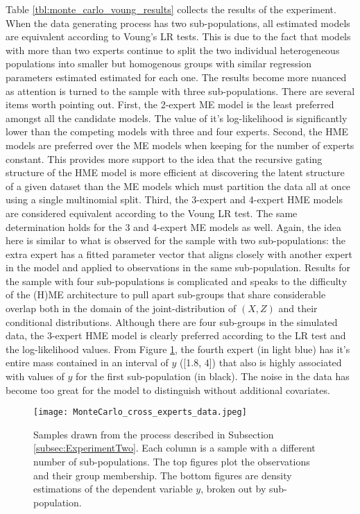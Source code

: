 \documentclass[12pt]{article}
\theoremstyle{definition}
\begin{document}
Table \ref{tbl:monte_carlo_voung_results} collects the results of the experiment. When the data generating process has two sub-populations, all estimated models are equivalent according to Voung's LR tests. This is due to the fact that models with more than two experts continue to split the two individual heterogeneous populations into smaller but homogenous groups with similar regression parameters estimated estimated for each one. The results become more nuanced as attention is turned to the sample with three sub-populations. There are several items worth pointing out. First, the 2-expert ME model is the least preferred amongst all the candidate models. The value of it's log-likelihood is significantly lower than the competing models with three and four experts. Second, the HME models are preferred over the ME models when keeping for the number of experts constant. This provides more support to the idea that the recursive gating structure of the HME model is more efficient at discovering the latent structure of a given dataset than the ME models which must partition the data all at once using a single multinomial split. Third, the 3-expert and 4-expert HME models are considered equivalent according to the Voung LR test. The same determination holds for the 3 and 4-expert ME models as well. Again, the idea here is similar to what is observed for the sample with two sub-populations: the extra expert has a fitted parameter vector that aligns closely with another expert in the model and applied to observations in the same sub-population. Results for the sample with four sub-populations is complicated and speaks to the difficulty of the (H)ME architecture to pull apart sub-groups that share considerable overlap both in the domain of the joint-distribution of $(X, Z)$ and their conditional distributions. Although there are four sub-groups in the simulated data, the 3-expert HME model is clearly preferred according to the LR test and the log-likelihood values. From Figure \ref{fig:MonteCarlo_cross_experts}, the fourth expert (in light blue) has it's entire mass contained in an interval of $y$ ([1.8, 4]) that also is highly associated with values of $y$ for the first sub-population (in black). The noise in the data has become too great for the model to distinguish without additional covariates.

\begin{figure}[t!]
  \texttt{[image: MonteCarlo\_cross\_experts\_data.jpeg]}
  \caption{Samples drawn from the process described in Subsection \ref{subsec:ExperimentTwo}. Each column is a sample with a different number of sub-populations. The top figures plot the observations and their group membership. The bottom figures are density estimations of the dependent variable $y$, broken out by sub-population.}
  \label{fig:MonteCarlo_cross_experts}
\end{figure}
\end{document}

